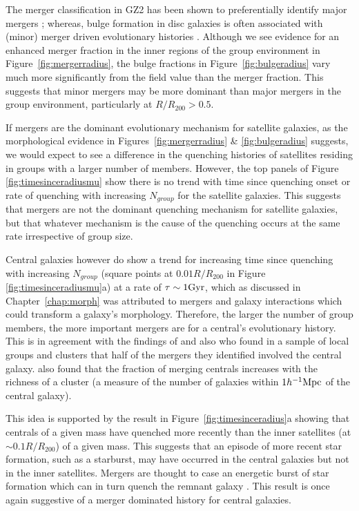The merger classification in GZ2 has been shown to preferentially identify major mergers \citep{Darg10a}; whereas, bulge formation in disc galaxies is often associated with (minor) merger driven evolutionary histories \citep{croton06, tonini16}.  Although we see evidence for an enhanced merger fraction in the inner regions of the group environment in Figure~\ref{fig:mergerradius}, the bulge fractions in Figure~\ref{fig:bulgeradius} vary much more significantly from the field value than the merger fraction. This suggests that minor mergers may be more dominant than major mergers in the group environment, particularly at $R/R_{200} > 0.5$. 

If mergers are the dominant evolutionary mechanism for satellite galaxies, as the morphological evidence in Figures~\ref{fig:mergerradius} \& \ref{fig:bulgeradius} suggests, we would expect to see a difference in the quenching histories of satellites residing in groups with a larger number of members. However, the top panels of Figure \ref{fig:timesinceradiusmu} show there is no trend with time since quenching onset or rate of quenching with increasing $N_{group}$ for the satellite galaxies. This suggests that mergers are not the dominant quenching mechanism for satellite galaxies, but that whatever mechanism is the cause of the quenching occurs at the same rate irrespective of group size. 

Central galaxies however do show a trend for increasing time since quenching with increasing $N_{group}$  (square points at $0.01 R/R_{200}$ in Figure \ref{fig:timesinceradiusmu}a) at a rate of $\tau \sim 1 \rm{Gyr}$, which as discussed in Chapter~\ref{chap:morph} was attributed to mergers and galaxy interactions which could transform a galaxy's morphology. Therefore, the larger the number of group members, the more important mergers are for a central's evolutionary history. This is in agreement with the findings of \citet{lin10, ellison10, lidman13} and also \citet{mcintosh08} who found in a sample of local groups and clusters that half of the mergers they identified involved the central galaxy. \cite{liu09} also found that the fraction of merging centrals increases with the richness of a cluster (a measure of the number of galaxies within $1h^{-1}\rm{Mpc}$ of the central galaxy).

This idea is supported by the result in Figure~\ref{fig:timesinceradius}a showing that centrals of a given mass have quenched more recently than the inner satellites (at $\sim0.1R/R_{200}$) of a given mass. This suggests that an episode of more recent star formation, such as a starburst, may have occurred in the central galaxies but not in the inner satellites. Mergers are thought to case an energetic burst of star formation which can in turn quench the remnant galaxy \citep[][as discussed in Section \ref{rapid}]{hopkins05, treister12, pontzen16}. This result is once again suggestive of a merger dominated history for central galaxies. 

